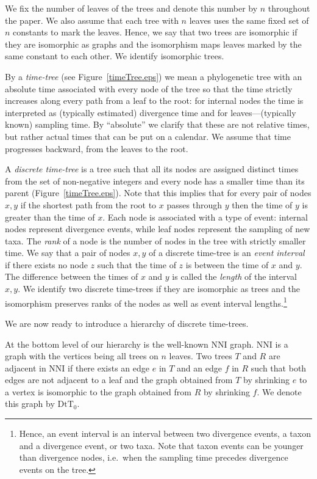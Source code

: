 \documentclass[11pt]{amsart}
\theoremstyle{definition}
\newcommand{\nni}{\mathrm{NNI}}
\newcommand{\dtt}{\mathrm{DtT}}
\begin{document}
We fix the number of leaves of the trees and denote this number by $n$ throughout the paper.
We also assume that each tree with $n$ leaves uses the same fixed set of $n$ constants to mark the leaves.
Hence, we say that two trees are isomorphic if they are isomorphic as graphs and the isomorphism maps leaves marked by the same constant to each other.
We identify isomorphic trees.

By a \emph{time-tree} (see Figure~\ref{timeTree.eps}) we mean a phylogenetic tree with an absolute time associated with every node of the tree so that the time strictly increases along every path from a leaf to the root: for internal nodes the time is interpreted as (typically estimated) divergence time and for leaves---(typically known) sampling time.
By ``absolute'' we clarify that these are not relative times, but rather actual times that can be put on a calendar.
We assume that time progresses backward, from the leaves to the root.

A \emph{discrete time-tree} is a tree such that all its nodes are assigned distinct times from the set of non-negative integers and every node has a smaller time than its parent (Figure~\ref{timeTree.eps}).
Note that this implies that for every pair of nodes $x,y$ if the shortest path from the root to $x$ passes through $y$ then the time of $y$ is greater than the time of $x$.
Each node is associated with a type of event: internal nodes represent divergence events, while leaf nodes represent the sampling of new taxa.
The \emph{rank} of a node is the number of nodes in the tree with strictly smaller time.
We say that a pair of nodes $x,y$ of a discrete time-tree is an \emph{event interval} if there exists no node $z$ such that the time of $z$ is between the time of $x$ and $y$.
The difference between the times of $x$ and $y$ is called the \emph{length} of the interval $x,y$.
We identify two discrete time-trees if they are isomorphic as trees and the isomorphism preserves ranks of the nodes as well as event interval lengths.\footnote{
Hence, an event interval is an interval between two divergence events, a taxon and a divergence event, or two taxa.
Note that taxon events can be younger than divergence nodes, i.e.\ when the sampling time precedes divergence events on the tree.}

We are now ready to introduce a hierarchy of discrete time-trees.

At the bottom level of our hierarchy is the well-known $\nni$ graph.
$\nni$ is a graph with the vertices being all trees on $n$ leaves.
Two trees $T$ and $R$ are adjacent in $\nni$ if there exists an edge $e$ in $T$ and an edge $f$ in $R$ such that both edges are not adjacent to a leaf and the graph obtained from $T$ by shrinking $e$ to a vertex is isomorphic to the graph obtained from $R$ by shrinking $f$.
We denote this graph by $\dtt_0$.
\end{document}
